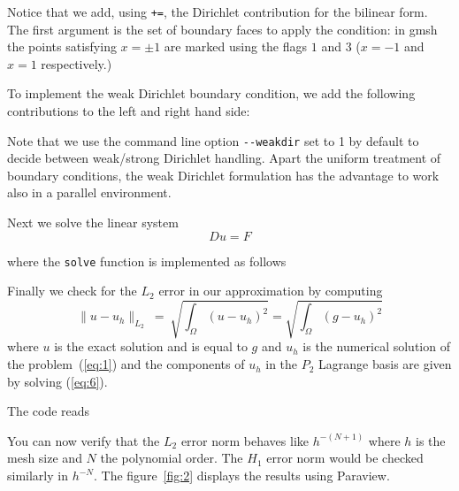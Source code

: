 \documentclass[a4paper]{book}
\begin{document}


Notice that we add, using \lstinline!+=!, the Dirichlet contribution
for the bilinear form. The first argument is the set of boundary faces
to apply the condition: in gmsh the points satisfying $x=\pm 1$ are
marked using the flags $1$ and $3$ ($x=-1$ and $x=1$ respectively.)

To implement the weak Dirichlet boundary condition, we add the
following contributions to the left and right hand side:




Note that we use the command line option \lstinline!--weakdir! set to
1 by default to decide between weak/strong Dirichlet handling.  Apart
the uniform treatment of boundary conditions, the weak Dirichlet
formulation has the advantage to work also in a parallel environment.

Next we solve the linear system
\begin{equation}
  \label{eq:6}
  D u = F
\end{equation}

where the \lstinline!solve! function is implemented as follows



Finally we check for the $L_2$ error in our approximation by computing
\begin{equation}
  \label{eq:7}
  \|u-u_h\|_{L_2}\ =\ \sqrt{\int_\Omega (u-u_h)^2} = \sqrt{\int_\Omega (g-u_h)^2}
\end{equation}
where $u$ is the exact solution and is equal to $g$ and $u_h$ is the
numerical solution of the problem~(\ref{eq:1}) and the components of
$u_h$ in the $P_2$ Lagrange basis are given by solving (\ref{eq:6}).

The code reads




You can now verify that the $L_2$ error norm behaves like $h^{-(N+1)}$
where $h$ is the mesh size and $N$ the polynomial order. The $H_1$
error norm would be checked similarly in $h^{-N}$. The
figure~\ref{fig:2} displays the results using Paraview.
\end{document}
